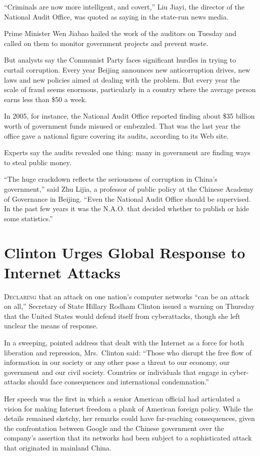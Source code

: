 ﻿\documentclass[12pt]{article}
\begin{document}
``Criminals are now more intelligent, and covert,'' Liu Jiayi, the director of the National Audit
Office, was quoted as saying in the state-run news media.

Prime Minister Wen Jiabao hailed the work of the auditors on Tuesday and called on them to monitor
government projects and prevent waste.

But analysts say the Communist Party faces significant hurdles in trying to curtail corruption.
Every year Beijing announces new anticorruption drives, new laws and new policies aimed at dealing
with the problem. But every year the scale of fraud seems enormous, particularly in a country where
the average person earns less than \$50 a week.

In 2005, for instance, the National Audit Office reported finding about \$35 billion worth of
government funds misused or embezzled. That was the last year the office gave a national figure
covering its audits, according to its Web site.

Experts say the audits revealed one thing: many in government are finding ways to steal public
money.

``The huge crackdown reflects the seriousness of corruption in China's government,'' said Zhu Lijia,
a professor of public policy at the Chinese Academy of Governance in Beijing. ``Even the National
Audit Office should be supervised. In the past few years it was the N.A.O. that decided whether to
publish or hide some statistics.''

\section{Clinton Urges Global Response to Internet Attacks}

\lettrine{D}{eclaring} that an attack on one nation's computer networks
``can be an attack on all,'' Secretary of State Hillary Rodham Clinton issued a warning on Thursday
that the United States would defend itself from cyberattacks, though she left unclear the means of
response.

In a sweeping, pointed address that dealt with the Internet as a force for both liberation and
repression, Mrs.~Clinton said: ``Those who disrupt the free flow of information in our society or
any other pose a threat to our economy, our government and our civil society. Countries or
individuals that engage in cyber-attacks should face consequences and international condemnation.''

Her speech was the first in which a senior American official had articulated a vision for making
Internet freedom a plank of American foreign policy. While the details remained sketchy, her remarks
could have far-reaching consequences, given the confrontation between Google and the Chinese
government over the company's assertion that its networks had been subject to a sophisticated attack
that originated in mainland China.
\end{document}
